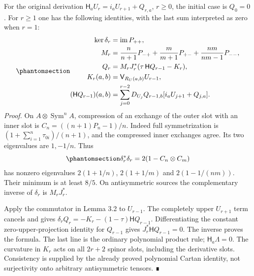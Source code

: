 \documentclass[
  english,
  11pt,
  reqno]{amsart}
\begin{document}
For the original derivation \(\mathsf H_aU_r=i_aU_{r+1}+Q_{r,a}\),
\(r\ge0\), the initial case is \(Q_0=0\). For \(r\ge1\) one has the
following identities, with the last sum interpreted as zero when
\(r=1\):
\begin{equation}\protect\phantomsection\label{eq:gg-budget-actual-recursion}{
 \begin{aligned}
 \ker\delta_r&=\operatorname{im}P_{++},\\
 M_r&=\frac n{n+1}P_{-+}+\frac m{m+1}P_{+-}
                         +\frac{nm}{nm-1}P_{--},\\
 Q_r&=M_rJ_r^*(\tau\,\mathsf H Q_{r-1}-K_r),\\
 K_r(a,b)&=\mathsf V_{R_U(a,b)}U_{r-1},\\
 (\mathsf H Q_{r-1})(a,b)
  &=\sum_{j=0}^{r-2}D_{U_j}Q_{r-1,b}
                         [i_aU_{j+1}+Q_{j,a}].
 \end{aligned}
}\end{equation} \emph{Proof.} On \(A\otimes\operatorname{Sym}^nA\),
compression of an exchange of the outer slot with an inner slot is
\(C_n=((n+1)P_n-1)/n\). Indeed full symmetrization is
\((1+\sum_{i=1}^n\tau_{0i})/(n+1)\), and the compressed inner exchanges
agree. Its two eigenvalues are \(1,-1/n\). Thus
\begin{equation}\protect\phantomsection\label{eq:gg-budget-spencer-spectrum}{
 \delta_r^*\delta_r=2(1-C_n\otimes C_m)
}\end{equation} has nonzero eigenvalues \(2(1+1/n)\), \(2(1+1/m)\) and
\(2(1-1/(nm))\). Their minimum is at least \(8/5\). On antisymmetric
sources the complementary inverse of \(\delta_r\) is \(M_rJ_r^*\).

Apply the commutator in Lemma 3.2 to \(U_{r-1}\). The completely upper
\(U_{r+1}\) term cancels and gives
\(\delta_rQ_r=-K_r-(1-\tau)\mathsf H Q_{r-1}\). Differentiating the
constant zero-upper-projection identity for \(Q_{r-1}\) gives
\(J_r^*\mathsf H Q_{r-1}=0\). The inverse proves the formula. The last
line is the ordinary polynomial product rule; \(\mathsf H_a\Lambda=0\).
The curvature in \(K_r\) acts on all \(2r+2\) spinor slots, including
the derivative slots. Consistency is supplied by the already proved
polynomial Cartan identity, not surjectivity onto arbitrary
antisymmetric tensors. ∎
\end{document}
